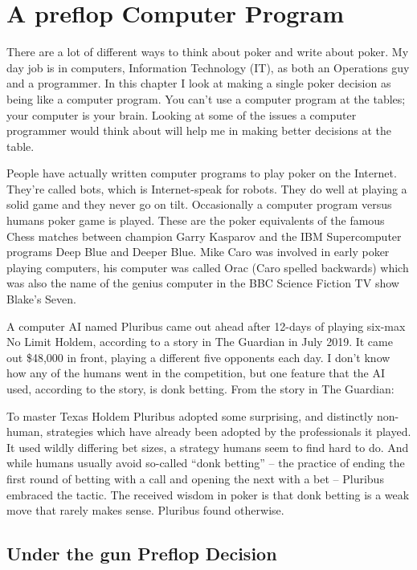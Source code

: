 \chapter{A preflop Computer Program}


There are a lot of different ways to think about poker and write
about poker. My day job is in computers, Information Technology (IT),
as both an Operations guy and a programmer. In this chapter I look at
making a single poker decision as being like a computer program. You
can't use a computer program at the tables; your computer is your
brain. Looking at some of the issues a computer programmer would think
about will help me in making better decisions at the table.

People have actually written computer programs to play poker on
the Internet. They're called bots, which is Internet-speak for
robots. They do well at playing a solid game and they never go on tilt.
Occasionally a computer program versus humans poker game is played.
These are the poker equivalents of the famous Chess matches between
champion Garry Kasparov and the IBM Supercomputer programs Deep Blue
and Deeper Blue. Mike Caro was involved in early poker playing
computers, his computer was called Orac (Caro spelled backwards) which
was also the name of the genius computer in the BBC Science Fiction TV
show Blake's Seven.

A computer AI named Pluribus came out ahead after 12-days of playing
six-max No Limit Holdem, according to a story in The Guardian in
July 2019. It came out \$48,000 in front, playing a different five
opponents each day. I don't know how any of the humans went in the
competition, but one feature that the AI used, according to the story,
is donk betting. From the story in The Guardian:

To master Texas Holdem Pluribus adopted some surprising, and
distinctly non-human, strategies which have already been adopted by
the professionals it played. It used wildly differing bet sizes, a
strategy humans seem to find hard to do. And while humans usually
avoid so-called ``donk betting'' – the practice of ending the first
round of betting with a call and opening the next with a bet –
Pluribus embraced the tactic. The received wisdom in poker is that
donk betting is a weak move that rarely makes sense. Pluribus found
otherwise.


\section*{Under the gun Preflop Decision}

